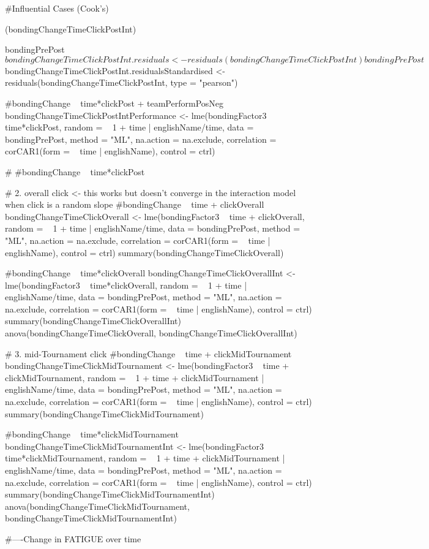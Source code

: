 #Influential Cases (Cook's)

(bondingChangeTimeClickPostInt)

bondingPrePost$bondingChangeTimeClickPostInt.residuals <- residuals(bondingChangeTimeClickPostInt)
bondingPrePost$bondingChangeTimeClickPostInt.residualsStandardised <- residuals(bondingChangeTimeClickPostInt, type = "pearson")


#bondingChange ~ time*clickPost + teamPerformPosNeg
bondingChangeTimeClickPostIntPerformance <- lme(bondingFactor3 ~ time*clickPost, random = ~ 1 + time | englishName/time, data = bondingPrePost, method = "ML",
                                                                                 na.action = na.exclude, correlation = corCAR1(form = ~ time | englishName), control = ctrl)

# #bondingChange ~ time*clickPost



# 2. overall click <- this works but doesn't converge in the interaction model when click is a random slope
#bondingChange ~ time + clickOverall
bondingChangeTimeClickOverall <- lme(bondingFactor3 ~ time + clickOverall, random = ~ 1 + time  | englishName/time, data = bondingPrePost, method = "ML",
                                  na.action = na.exclude, correlation = corCAR1(form = ~ time | englishName), control = ctrl)
summary(bondingChangeTimeClickOverall)

#bondingChange ~ time*clickOverall
bondingChangeTimeClickOverallInt <- lme(bondingFactor3 ~ time*clickOverall, random = ~ 1 + time  | englishName/time, data = bondingPrePost, method = "ML",
                                     na.action = na.exclude, correlation = corCAR1(form = ~ time | englishName), control = ctrl)
summary(bondingChangeTimeClickOverallInt)
anova(bondingChangeTimeClickOverall, bondingChangeTimeClickOverallInt)

# 3. mid-Tournament click
#bondingChange ~ time + clickMidTournament
bondingChangeTimeClickMidTournament <- lme(bondingFactor3 ~ time + clickMidTournament, random = ~ 1 + time + clickMidTournament  | englishName/time, data = bondingPrePost, method = "ML",
                                     na.action = na.exclude, correlation = corCAR1(form = ~ time | englishName), control = ctrl)
summary(bondingChangeTimeClickMidTournament)

#bondingChange ~ time*clickMidTournament
bondingChangeTimeClickMidTournamentInt <- lme(bondingFactor3 ~ time*clickMidTournament, random = ~ 1 + time + clickMidTournament | englishName/time, data = bondingPrePost, method = "ML",
                                        na.action = na.exclude, correlation = corCAR1(form = ~ time | englishName), control = ctrl)
summary(bondingChangeTimeClickMidTournamentInt)
anova(bondingChangeTimeClickMidTournament, bondingChangeTimeClickMidTournamentInt)






#----Change in FATIGUE over time
